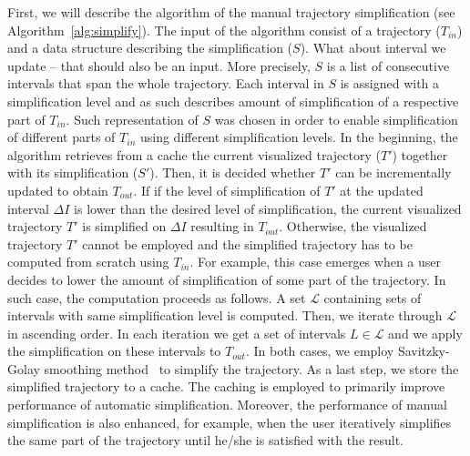 First, we will describe the algorithm of the manual trajectory simplification (see Algorithm~\ref{alg:simplify}).
The input of the algorithm consist of a trajectory ($T_{in}$) and a data structure describing the simplification ($S$). \textcolor[rgb]{1,0,0}{What about interval we update -- that should also be an input.}
More precisely, $S$ is a list of consecutive intervals that span the whole trajectory.
Each interval in $S$ is assigned with a simplification level and as such describes amount of simplification of a respective part of $T_{in}$.
Such representation of $S$ was chosen in order to enable simplification of different parts of $T_{in}$ using different simplification levels.
In the beginning, the algorithm retrieves from a cache the current visualized trajectory ($T'$) together with its simplification ($S'$).
Then, it is decided whether $T'$ can be incrementally updated to obtain $T_{out}$. 
If if the level of simplification of $T'$ at the updated interval $\Delta I$ is lower than the desired level of simplification, the current visualized trajectory $T'$ is simplified on $\Delta I$ resulting in $T_{out}$.
Otherwise, the visualized trajectory $T'$ cannot be employed and the simplified trajectory has to be computed from scratch using $T_{in}$.
For example, this case emerges when a user decides to lower the amount of simplification of some part of the trajectory.
In such case, the computation proceeds as follows.
A set $\mathcal{L}$ containing sets of intervals with same simplification level is computed.
Then, we iterate through $\mathcal{L}$ in ascending order.
In each iteration we get a set of intervals $L \in \mathcal{L}$ and we apply the simplification on these intervals to $T_{out}$.
In both cases, we employ Savitzky-Golay smoothing method~\cite{savitzky1964smoothing} to simplify the trajectory.
As a last step, we store the simplified trajectory to a cache.
The caching is employed to primarily improve performance of automatic simplification.
Moreover, the performance of manual simplification is also enhanced, for example, when the user iteratively simplifies the same part of the trajectory until he/she is satisfied with the result.


